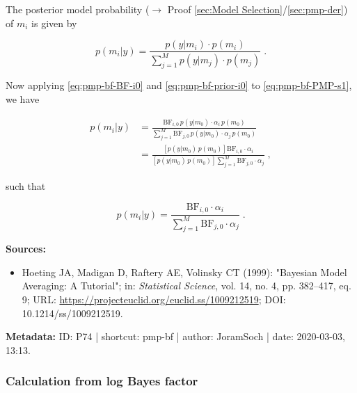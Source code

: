 \documentclass[a4paper,12pt,twoside]{book}
\begin{document}
The posterior model probability ($\rightarrow$ Proof \ref{sec:Model Selection}/\ref{sec:pmp-der}) of $m_i$ is given by

\begin{equation} \label{eq:pmp-bf-PMP-s1}
p(m_i|y) = \frac{p(y|m_i) \cdot p(m_i)}{\sum_{j=1}^{M} p(y|m_j) \cdot p(m_j)} \; .
\end{equation}

Now applying \eqref{eq:pmp-bf-BF-i0} and \eqref{eq:pmp-bf-prior-i0} to \eqref{eq:pmp-bf-PMP-s1}, we have

\begin{equation} \label{eq:pmp-bf-PMP-s2}
\begin{split}
p(m_i|y) &= \frac{ \mathrm{BF}_{i,0} \, p(y|m_0) \cdot \alpha_i \, p(m_0)}{\sum_{j=1}^{M} \mathrm{BF}_{j,0} \, p(y|m_0) \cdot \alpha_j \, p(m_0)} \\
&= \frac{\left[ p(y|m_0) \, p(m_0) \right] \mathrm{BF}_{i,0} \cdot \alpha_i}{\left[ p(y|m_0) \, p(m_0) \right] \sum_{j=1}^{M} \mathrm{BF}_{j,0} \cdot \alpha_j} \; ,
\end{split}
\end{equation}

such that

\begin{equation} \label{eq:pmp-bf-PMP-BF-qed}
p(m_i|y)= \frac{\mathrm{BF}_{i,0} \cdot \alpha_i}{\sum_{j=1}^{M} \mathrm{BF}_{j,0} \cdot \alpha_j} \; .
\end{equation}


\vspace{1em}
\textbf{Sources:}
\begin{itemize}
\item Hoeting JA, Madigan D, Raftery AE, Volinsky CT (1999): "Bayesian Model Averaging: A Tutorial"; in: \textit{Statistical Science}, vol. 14, no. 4, pp. 382–417, eq. 9; URL: \url{https://projecteuclid.org/euclid.ss/1009212519}; DOI: 10.1214/ss/1009212519.
\end{itemize}


\vspace{1em}
\textbf{Metadata:} ID: P74 | shortcut: pmp-bf | author: JoramSoch | date: 2020-03-03, 13:13.
\vspace{1em}



\subsubsection[\textbf{Calculation from log Bayes factor}]{Calculation from log Bayes factor} \label{sec:pmp-lbf}
\setcounter{equation}{0}
\end{document}
